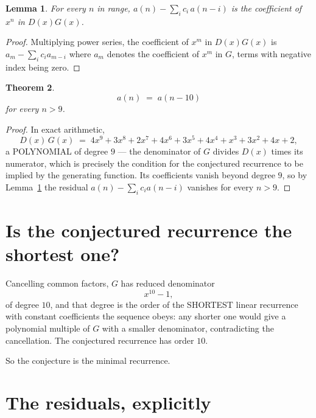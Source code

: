 \documentclass[11pt,a4paper]{article}
\theoremstyle{plain}
\newtheorem{theorem}{Theorem}
\newtheorem{lemma}[theorem]{Lemma}
\theoremstyle{definition}
\begin{document}
\begin{lemma}\label{lem:key}
For every $n$ in range, $a(n)-\sum_i c_i\,a(n-i)$ is the coefficient of $x^{n}$ in
$D(x)G(x)$.
\end{lemma}

\begin{proof}
Multiplying power series, the coefficient of $x^{m}$ in $D(x)G(x)$ is
$a_m-\sum_i c_i a_{m-i}$ where $a_m$ denotes the coefficient of $x^{m}$ in $G$, terms with
negative index being zero.
\end{proof}

\begin{theorem}
\[
a(n)\;=\;a(n-10)
\]
for every $n>9$.
\end{theorem}

\begin{proof}
In exact arithmetic,
\[
D(x)\,G(x)\;=\;4 x^{9} + 3 x^{8} + 2 x^{7} + 4 x^{6} + 3 x^{5} + 4 x^{4} + x^{3} + 3 x^{2} + 4 x + 2,
\]
a POLYNOMIAL of degree $9$ --- the denominator of $G$ divides $D(x)$ times its numerator,
which is precisely the condition for the conjectured recurrence to be implied by the
generating function. Its coefficients vanish beyond degree $9$, so by
Lemma~\ref{lem:key} the residual $a(n)-\sum_ic_ia(n-i)$ vanishes for every
$n>9$.
\end{proof}

\section{Is the conjectured recurrence the shortest one?}

Cancelling common factors, $G$ has reduced denominator
\[
x^{10} - 1,
\]
of degree $10$, and that degree is the order of the SHORTEST linear recurrence with
constant coefficients the sequence obeys: any shorter one would give a polynomial multiple of
$G$ with a smaller denominator, contradicting the cancellation. The conjectured recurrence has
order $10$.

So the conjecture is the minimal recurrence.

\section{The residuals, explicitly}
\end{document}
